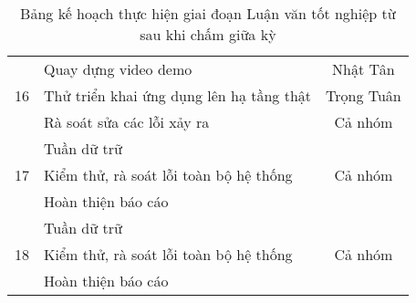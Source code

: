\documentclass[../main.tex]{subfiles}
\begin{document}
\begin{table}[ht]
\begin{tabular}{| c | p{10cm} | c |}
			\multirow{3}{*}{16} & Quay dựng video demo
			& Nhật Tân
			\\
			\cline{2-3}
			& Thử triển khai ứng dụng lên hạ tầng thật
			& Trọng Tuân
			\\
			\cline{2-3}
			& Rà soát sửa các lỗi xảy ra
			& Cả nhóm
			\\
			\hline

			\multirow{3}{*}{17} & Tuần dữ trữ & \multirow{
				3}{*}{Cả nhóm} \\ \cline{2-2}
			& Kiểm thử, rà soát lỗi toàn bộ hệ thống
			&
			\\
			\cline{2-2}
			& Hoàn thiện báo cáo
			&
			\\
			\cline{2-2}
			\hline

			\multirow{3}{*}{18} & Tuần dữ trữ & \multirow{
				3}{*}{Cả nhóm} \\ \cline{2-2}
			& Kiểm thử, rà soát lỗi toàn bộ hệ thống
			&
			\\
			\cline{2-2}
			& Hoàn thiện báo cáo
			&
			\\
			\cline{2-2}
			\hline

		\end{tabular}
		\caption{\centering Bảng kế hoạch thực hiện giai đoạn Luận văn tốt nghiệp từ sau khi chấm giữa kỳ}
		\label{tab:thesis_plan_cont}
	\end{table}

	\newpage
\end{document}
